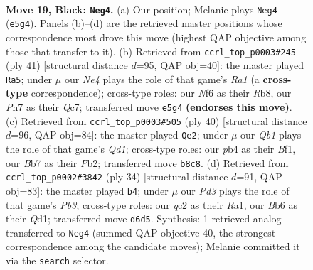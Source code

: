 \documentclass[11pt]{article}
\begin{document}
\clearpage

\begin{figure}[p]\centering
\begin{subfigure}{0.46\textwidth}\centering
\resizebox{\linewidth}{!}{%
\newchessgame
\chessboard[
  setfen={rq6/1bp2kpp/1b1p1n2/1N2n3/pP2P3/2P5/P1Q2PPP/1RB1RK2 b - - 0 19},
  showmover=false,
  pgfstyle=straightmove, color=movearrow, markmove={e5-g4}
]}
\caption{}
\end{subfigure}\hfill
\begin{subfigure}{0.46\textwidth}\centering
\resizebox{\linewidth}{!}{%
\newchessgame
\chessboard[
  setfen={rr4k1/2q1bppp/2pppn2/8/4PP2/1PN1B1QP/2P3P1/4RR1K b - - 2 21},
  showmover=false,
  pgfstyle=straightmove, color=movearrow, markmove={a8-a5}
]}
\caption{}
\end{subfigure}
\\[4pt]
\begin{subfigure}{0.46\textwidth}\centering
\resizebox{\linewidth}{!}{%
\newchessgame
\chessboard[
  setfen={1rb2rk1/2q1pp1p/pn4pP/p2Pp3/2P5/R1N5/1P3PP1/2BQ1BK1 w - - 0 21},
  showmover=false,
  pgfstyle=straightmove, color=movearrow, markmove={d1-e2}
]}
\caption{}
\end{subfigure}\hfill
\begin{subfigure}{0.46\textwidth}\centering
\resizebox{\linewidth}{!}{%
\newchessgame
\chessboard[
  setfen={1rbb1rk1/3q1ppp/p2p4/2nNp3/2B1P2P/1P4P1/5P2/R1BQR1K1 w - - 1 18},
  showmover=false,
  pgfstyle=straightmove, color=movearrow, markmove={b3-b4}
]}
\caption{}
\end{subfigure}
\caption{\textbf{Move 19, Black: \texttt{Neg4}.} (a) Our position; Melanie plays \texttt{Neg4} (\texttt{e5g4}). Panels (b)--(d) are the retrieved master positions whose correspondence most drove this move (highest QAP objective among those that transfer to it). (b) Retrieved from \texttt{ccrl\_top\_p0003\#245} (ply 41) [structural distance $d$=95, QAP obj=40]: the master played \texttt{Ra5}; under $\mu$ our \emph{Ne4} plays the role of that game's \emph{Ra1} (a \textbf{cross-type} correspondence); cross-type roles: our \emph{N}f6 as their \emph{R}b8, our \emph{P}h7 as their \emph{Q}c7; transferred move \texttt{e5g4} \textbf{(endorses this move)}. (c) Retrieved from \texttt{ccrl\_top\_p0003\#505} (ply 40) [structural distance $d$=96, QAP obj=84]: the master played \texttt{Qe2}; under $\mu$ our \emph{Qb1} plays the role of that game's \emph{Qd1}; cross-type roles: our \emph{p}b4 as their \emph{B}f1, our \emph{B}b7 as their \emph{P}b2; transferred move \texttt{b8c8}. (d) Retrieved from \texttt{ccrl\_top\_p0002\#3842} (ply 34) [structural distance $d$=91, QAP obj=83]: the master played \texttt{b4}; under $\mu$ our \emph{Pd3} plays the role of that game's \emph{Pb3}; cross-type roles: our \emph{q}c2 as their \emph{R}a1, our \emph{B}b6 as their \emph{Q}d1; transferred move \texttt{d6d5}. Synthesis: 1 retrieved analog transferred to \texttt{Neg4} (summed QAP objective 40, the strongest correspondence among the candidate moves); Melanie committed it via the \texttt{search} selector.}
\label{fig:thought-m37}
\end{figure}
\end{document}
